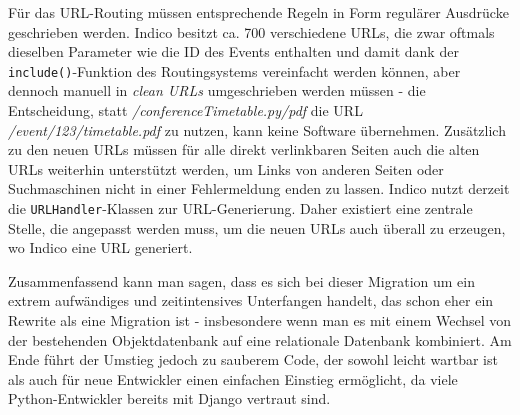 Für das URL-Routing müssen entsprechende Regeln in Form regulärer Ausdrücke geschrieben werden.
Indico besitzt ca. 700 verschiedene URLs, die zwar oftmals dieselben Parameter wie die ID des Events
enthalten und damit dank der \lstinline{include()}-Funktion des Routingsystems vereinfacht werden
können, aber dennoch manuell in \emph{clean URLs} umgeschrieben werden müssen - die Entscheidung,
statt \emph{/conferenceTimetable.py/pdf} die URL \emph{/event/123/timetable.pdf} zu
nutzen, kann keine Software übernehmen. Zusätzlich zu den neuen URLs müssen für alle direkt
verlinkbaren Seiten auch die alten URLs weiterhin unterstützt werden, um Links von
anderen Seiten oder Suchmaschinen nicht in einer Fehlermeldung enden zu lassen. Indico nutzt derzeit
die \lstinline{URLHandler}-Klassen zur URL-Generierung. Daher existiert eine zentrale Stelle, die
angepasst werden muss, um die neuen URLs auch überall zu erzeugen, wo Indico eine URL generiert.

Zusammenfassend kann man sagen, dass es sich bei dieser Migration um ein extrem aufwändiges und
zeitintensives Unterfangen handelt, das schon eher ein Rewrite als eine Migration ist - insbesondere
wenn man es mit einem Wechsel von der bestehenden Objektdatenbank auf eine relationale Datenbank
kombiniert. Am Ende führt der Umstieg jedoch zu sauberem Code, der sowohl leicht wartbar ist als
auch für neue Entwickler einen einfachen Einstieg ermöglicht, da viele Python-Entwickler bereits mit
Django vertraut sind.


